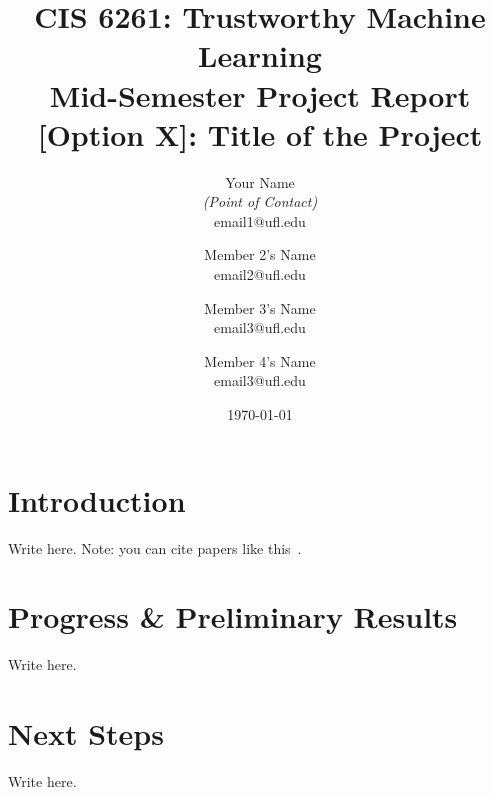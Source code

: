 \documentclass[11pt,letterpaper]{article}
\title{CIS 6261: Trustworthy Machine Learning\\
	\Large Mid-Semester Project Report [Option X]: Title of the Project} %
\author{
        Your Name \\{\em (Point of Contact)} \\
        email1@ufl.edu\\
        \and
        Member 2's Name \\
        email2@ufl.edu\\
        \and
        Member 3's Name \\
        email3@ufl.edu\\
        \and
        Member 4's Name \\
        email3@ufl.edu\\
}
\date{\today}
\begin{document}

\maketitle



\section{Introduction}
Write here. Note: you can cite papers like this~\cite{vapnik1994measuring}.


\section{Progress \& Preliminary Results}
Write here.


\section{Next Steps}
Write here.





\end{document}

